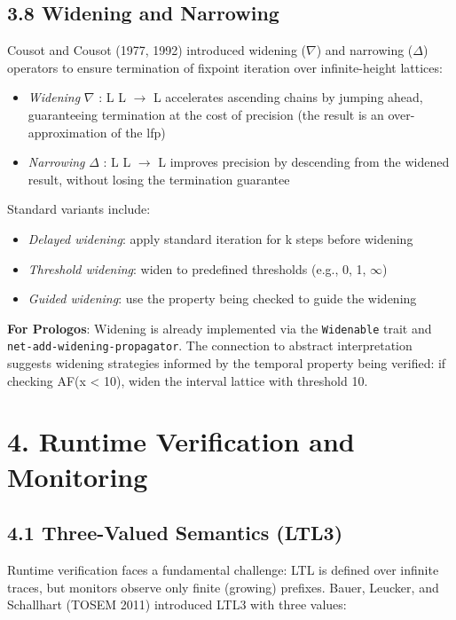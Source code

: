 \documentclass[11pt]{article}
\begin{document}
\subsection{3.8 Widening and Narrowing}
\label{sec:org82c40f8}

Cousot and Cousot (1977, 1992) introduced widening (\(\nabla\)) and narrowing
(\(\Delta\)) operators to ensure termination of fixpoint iteration over
infinite-height lattices:

\begin{itemize}
\item \emph{Widening} \(\nabla\) : L \texttimes{} L \(\to\) L accelerates ascending chains by
jumping ahead, guaranteeing termination at the cost of precision (the
result is an over-approximation of the lfp)
\item \emph{Narrowing} \(\Delta\) : L \texttimes{} L \(\to\) L improves precision by descending from
the widened result, without losing the termination guarantee
\end{itemize}

Standard variants include:
\begin{itemize}
\item \emph{Delayed widening}: apply standard iteration for k steps before widening
\item \emph{Threshold widening}: widen to predefined thresholds (e.g., 0, 1, \(\infty\))
\item \emph{Guided widening}: use the property being checked to guide the widening
\end{itemize}

\textbf{For Prologos}: Widening is already implemented via the \texttt{Widenable} trait and
\texttt{net-add-widening-propagator}. The connection to abstract interpretation
suggests widening strategies informed by the temporal property being verified:
if checking AF(x < 10), widen the interval lattice with threshold 10.
\section{4. Runtime Verification and Monitoring}
\label{sec:orgf24867d}

\subsection{4.1 Three-Valued Semantics (LTL3)}
\label{sec:org4565a4e}

Runtime verification faces a fundamental challenge: LTL is defined over
infinite traces, but monitors observe only finite (growing) prefixes. Bauer,
Leucker, and Schallhart (TOSEM 2011) introduced LTL3 with three values:
\end{document}
